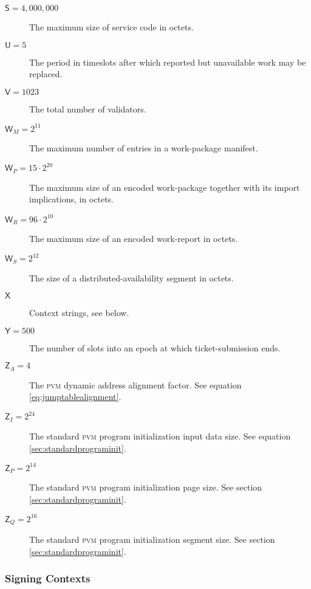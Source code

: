 \begin{description}
  \item[$\mathsf{S} = 4,000,000$] The maximum size of service code in octets.
  \item[$\mathsf{U} = 5$] The period in timeslots after which reported but unavailable work may be replaced.
  \item[$\mathsf{V} = 1023$] The total number of validators.
  \item[$\mathsf{W}_M = 2^{11}$] The maximum number of entries in a work-package manifest.
  \item[$\mathsf{W}_P = 15\cdot2^{20}$] The maximum size of an encoded work-package together with its import implications, in octets.
  \item[$\mathsf{W}_R = 96\cdot2^{10}$] The maximum size of an encoded work-report in octets.
  \item[$\mathsf{W}_S = 2^{12}$] The size of a distributed-availability segment in octets.
  \item[$\mathsf{X}$] Context strings, see below.
  \item[$\mathsf{Y} = 500$] The number of slots into an epoch at which ticket-submission ends.
  \item[$\mathsf{Z}_A = 4$] The \textsc{pvm} dynamic address alignment factor. See equation \ref{eq:jumptablealignment}.
  \item[$\mathsf{Z}_I = 2^{24}$] The standard \textsc{pvm} program initialization input data size. See equation \ref{sec:standardprograminit}.
  \item[$\mathsf{Z}_P = 2^{14}$] The standard \textsc{pvm} program initialization page size. See section \ref{sec:standardprograminit}.
  \item[$\mathsf{Z}_Q = 2^{16}$] The standard \textsc{pvm} program initialization segment size. See section \ref{sec:standardprograminit}.
\end{description}

\subsubsection{Signing Contexts}

